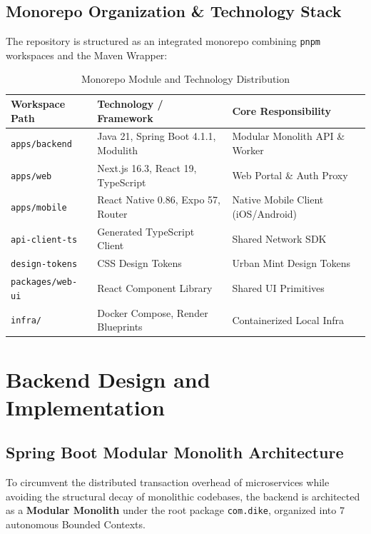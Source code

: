 \documentclass[conference,10pt,a4paper]{IEEEtran}
\begin{document}
\subsection{Monorepo Organization \& Technology Stack}
The repository is structured as an integrated monorepo combining \texttt{pnpm} workspaces and the Maven Wrapper:
\begin{table}[!ht]
\caption{Monorepo Module and Technology Distribution}
\label{tab:tech_stack}
\centering
\scriptsize
\begin{tabularx}{\columnwidth}{p{2.5cm}Xp{2.1cm}}
\toprule
\textbf{Workspace Path} & \textbf{Technology / Framework} & \textbf{Core Responsibility} \\
\midrule
\texttt{apps/backend} & Java 21, Spring Boot 4.1.1, Modulith & Modular Monolith API \& Worker \\
\texttt{apps/web} & Next.js 16.3, React 19, TypeScript & Web Portal \& Auth Proxy \\
\texttt{apps/mobile} & React Native 0.86, Expo 57, Router & Native Mobile Client (iOS/Android) \\
\texttt{api-client-ts} & Generated TypeScript Client & Shared Network SDK \\
\texttt{design-tokens} & CSS Design Tokens & Urban Mint Design Tokens \\
\texttt{packages/web-ui} & React Component Library & Shared UI Primitives \\
\texttt{infra/} & Docker Compose, Render Blueprints & Containerized Local Infra \\
\bottomrule
\end{tabularx}
\end{table}

\section{Backend Design and Implementation}

\subsection{Spring Boot Modular Monolith Architecture}
To circumvent the distributed transaction overhead of microservices while avoiding the structural decay of monolithic codebases, the backend is architected as a \textbf{Modular Monolith} under the root package \texttt{com.dike}, organized into 7 autonomous Bounded Contexts.
\end{document}
